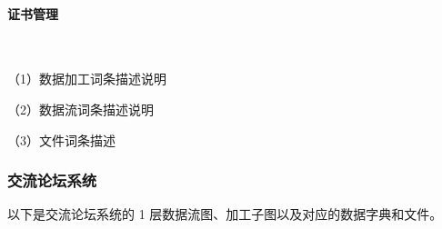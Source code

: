 \paragraph{证书管理}~{}
\\
\begin{figure}[H]
    \end{figure}
    
（1）数据加工词条描述说明


（2）数据流词条描述说明


（3）文件词条描述


\subsubsection{交流论坛系统}
以下是交流论坛系统的 1 层数据流图、加工子图以及对应的数据字典和文件。

